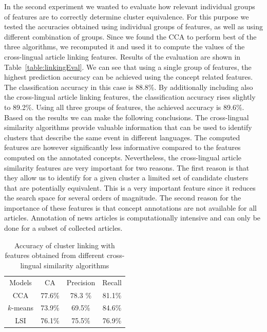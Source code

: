 \documentclass[twoside,11pt]{article}
\begin{document}
In the second experiment we wanted to evaluate how relevant individual groups of features are to correctly determine cluster equivalence. For this purpose we tested the accuracies obtained using individual groups of features, as well as using different combination of groups. Since we found the CCA to perform best of the three algorithms, we recomputed it and used it to compute the values of the cross-lingual article linking features. Results of the evaluation are shown in Table~\ref{table:linkingEval}. We can see that using a single group of features, the highest prediction accuracy can be achieved using the concept related features. The classification accuracy in this case is 88.8\%. By additionally including also the cross-lingual article linking features, the classification accuracy rises slightly to 89.2\%. Using all three groups of features, the achieved accuracy is 89.6\%.
Based on the results we can make the following conclusions. The cross-lingual similarity algorithms provide valuable information that can be used to identify clusters that describe the same event in different languages. The computed features are however significantly less informative compared to the features computed on the annotated concepts. Nevertheless, the cross-lingual article similarity features are very important for two reasons. The first reason is that they allow us to identify for a given cluster a limited set of candidate clusters that are potentially equivalent. This is a very important feature since it reduces the search space for several orders of magnitude. The second reason for the importance of these features is that concept annotations are not available for all articles. Annotation of news articles is computationally intensive and can only be done for a subset of collected articles.

\begin{table}[h]
\caption{Accuracy of cluster linking with features obtained from different cross-lingual similarity algorithms}
\label{table:linkingEvalAlgos}
\begin{center}
\begin{tabular}{|c|c|c|c|}
  \hline
  \cline{1-4}
  Models & CA & Precision & Recall \\ \cline{1-4}
  CCA & 77.6\% & 78.3 \%  & 81.1\%  \\ \cline{1-4}
  $k$-means & 73.9\% & 69.5\%  & 84.6\%  \\ \cline{1-4}
  LSI & 76.1\% & 75.5\%  & 76.9\%  \\ \cline{1-4}
  \hline
\end{tabular}
\end{center}
\end{table}
\end{document}

